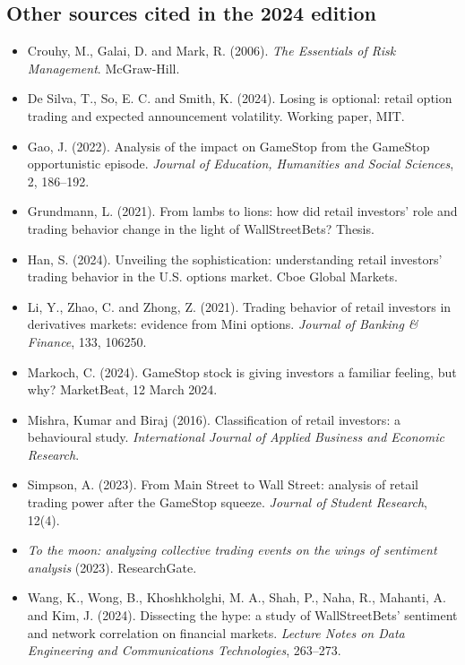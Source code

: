 \documentclass[11pt,a4paper]{article}
\begin{document}
\subsection*{Other sources cited in the 2024 edition}
{\small
\begin{itemize}[leftmargin=*]
\item Crouhy, M., Galai, D. and Mark, R. (2006). \emph{The Essentials of Risk
Management}. McGraw-Hill.
\item De Silva, T., So, E. C. and Smith, K. (2024). Losing is optional: retail
option trading and expected announcement volatility. Working paper, MIT.
\item Gao, J. (2022). Analysis of the impact on GameStop from the GameStop
opportunistic episode. \emph{Journal of Education, Humanities and Social
Sciences}, 2, 186--192.
\item Grundmann, L. (2021). From lambs to lions: how did retail investors' role
and trading behavior change in the light of WallStreetBets? Thesis.
\item Han, S. (2024). Unveiling the sophistication: understanding retail
investors' trading behavior in the U.S. options market. Cboe Global Markets.
\item Li, Y., Zhao, C. and Zhong, Z. (2021). Trading behavior of retail investors
in derivatives markets: evidence from Mini options. \emph{Journal of Banking \&
Finance}, 133, 106250.
\item Markoch, C. (2024). GameStop stock is giving investors a familiar feeling,
but why? MarketBeat, 12 March 2024.
\item Mishra, Kumar and Biraj (2016). Classification of retail investors: a
behavioural study. \emph{International Journal of Applied Business and Economic
Research}.
\item Simpson, A. (2023). From Main Street to Wall Street: analysis of retail
trading power after the GameStop squeeze. \emph{Journal of Student Research},
12(4).
\item \emph{To the moon: analyzing collective trading events on the wings of
sentiment analysis} (2023). ResearchGate.
\item Wang, K., Wong, B., Khoshkholghi, M. A., Shah, P., Naha, R., Mahanti, A.
and Kim, J. (2024). Dissecting the hype: a study of WallStreetBets' sentiment and
network correlation on financial markets. \emph{Lecture Notes on Data Engineering
and Communications Technologies}, 263--273.
\end{itemize}
}
\end{document}
